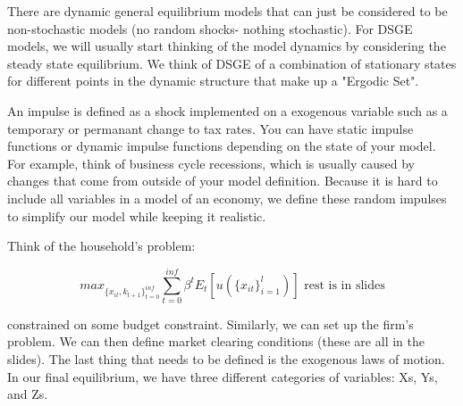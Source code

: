 \documentclass[a4paper]{article}
\begin{document}
There are dynamic general equilibrium models that can just be considered to be non-stochastic models (no random shocks- nothing stochastic). For DSGE models, we will usually start thinking of the model dynamics by considering the steady state equilibrium. We think of DSGE of a combination of stationary states for different points in the dynamic structure that make up a "Ergodic Set".

An impulse is defined as a shock implemented on a exogenous variable such as a temporary or permanant change to tax rates. You can have static impulse functions or dynamic impulse functions depending on the state of your model. For example, think of business cycle recessions, which is usually caused by changes that come from outside of your model definition. Because it is hard to include all variables in a model of an economy, we define these random impulses to simplify our model while keeping it realistic.

Think of the household's problem:

$$max_{\{x_{it}, k_{t+1}\}_{t=0}^{inf}} \sum_{t=0}^{inf}\beta^t E_t[u(\{x_{it}\}_{i=1}^l)] \text{  rest is in slides}$$

constrained on some budget constraint. Similarly, we can set up the firm's problem. We can then define market clearing conditions (these are all in the slides). The last thing that needs to be defined is the exogenous laws of motion. In our final equilibrium, we have three different categories of variables: Xs, Ys, and Zs.
\end{document}
